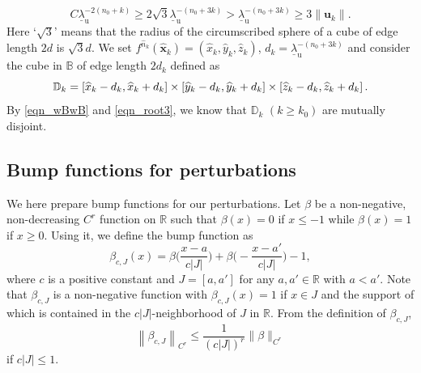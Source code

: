 \documentclass{amsart}
\theoremstyle{definition}
\numberwithin{equation}{section}
\numberwithin{figure}{section}
\begin{document}
\begin{equation}\label{eqn_root3}
C\underline{\lambda}_{\mathrm{u}}^{-2(n_0+k)}\geq 2\sqrt3 \underline{\lambda}_{\mathrm{u}}^{-(n_0+3k)}>\underline{\lambda}_{\mathrm{u}}^{-(n_0+3k)}\geq 
3\|\boldsymbol{u}_k\|.
\end{equation}
Here `$\sqrt3$' means that the radius of the circumscribed sphere of a cube of edge length $2d$ is $\sqrt3 d$.
We set $f^{\widehat{n}_k}(\widehat{\boldsymbol{x}}_k)=(\widehat x_k,\widehat y_k,\widehat z_k)$, $d_k=\underline{\lambda}_{\mathrm{u}}^{-(n_0+3k)}$
and consider the cube in $\mathbb{B}$ of edge length $2d_k$ defined as
$$\mathbb{D}_k\index{Dk@$\mathbb{D}_k$}=\left[\widehat x_k-d_k,\widehat x_k+d_k\right]\times \left[\widehat y_k-d_k,\widehat y_k+d_k\right]\times \left[\widehat z_k-d_k,\widehat z_k+d_k\right].$$
By \eqref{eqn_wBwB} and 
\eqref{eqn_root3}, we know that $\mathbb{D}_k$ $(k\geq k_0)$ are mutually disjoint.





\subsection{Bump functions for perturbations}\label{ss_bump}

We here prepare bump functions for our perturbations.
Let $\beta$ be  
a non-negative, non-decreasing $C^{r}$ function on $\mathbb{R}$
such that $\beta (x)=0$ if $x\leq -1$ while $\beta(x)=1$ if $x\geq 0$. 
Using it, we define the bump function as   
$$
\beta _{c, J}(x)=\beta \biggl(\frac{x-a}{c|J|}\biggr)+\beta \biggl(-\frac{x-a'}{c|J|}\biggr)-1,
$$
where $c$ is a positive constant and $J=[a, a']$ for any $a, a'\in \mathbb{R}$ with $a<a'$.
Note that $\beta_{c,J}$ is a non-negative function with $\beta_{c,J}(x)=1$ if $x\in J$ and 
the support of which is contained in the $c|J|$-neighborhood of $J$ in $\mathbb{R}$.
From the definition of $\beta_{c,J}$,  
\begin{equation}\label{eqn_|bump|}
\left\|
\beta_{c, J}
\right\|_{C^{r}}\leq 
\frac{1}{(c|J|)^{r}} 
\|
\beta 
\|_{C^{r}}
\end{equation}
if $c|J|\leq 1$.
\end{document}

